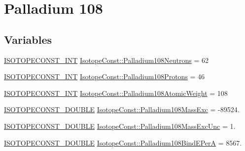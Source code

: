\hypertarget{group___isotope_const-_palladium-_pd108}{}\section{Palladium 108}
\label{group___isotope_const-_palladium-_pd108}
\subsection*{Variables}
\begin{DoxyCompactItemize}
\item 
\mbox{\hyperlink{group___isotope_const-_macros_ga5f18360b3e99483a35c32d789e62621c}{I\+S\+O\+T\+O\+P\+E\+C\+O\+N\+S\+T\+\_\+\+I\+NT}} \mbox{\hyperlink{group___isotope_const-_palladium-_pd108_ga0e9a31378d76be4f09b95a631b1e53ab}{Isotope\+Const\+::\+Palladium108\+Neutrons}} = 62
\item 
\mbox{\hyperlink{group___isotope_const-_macros_ga5f18360b3e99483a35c32d789e62621c}{I\+S\+O\+T\+O\+P\+E\+C\+O\+N\+S\+T\+\_\+\+I\+NT}} \mbox{\hyperlink{group___isotope_const-_palladium-_pd108_ga10b0eca9edb32d4bb560fc6b6796129f}{Isotope\+Const\+::\+Palladium108\+Protons}} = 46
\item 
\mbox{\hyperlink{group___isotope_const-_macros_ga5f18360b3e99483a35c32d789e62621c}{I\+S\+O\+T\+O\+P\+E\+C\+O\+N\+S\+T\+\_\+\+I\+NT}} \mbox{\hyperlink{group___isotope_const-_palladium-_pd108_ga8c3a585e456622df15ea3f302b5b0c2b}{Isotope\+Const\+::\+Palladium108\+Atomic\+Weight}} = 108
\item 
\mbox{\hyperlink{group___isotope_const-_macros_ga8f45a7272ce02c0b4c65c44636ed719a}{I\+S\+O\+T\+O\+P\+E\+C\+O\+N\+S\+T\+\_\+\+D\+O\+U\+B\+LE}} \mbox{\hyperlink{group___isotope_const-_palladium-_pd108_gaf3197bfd3aa5b496fa66a2fc3f87e04f}{Isotope\+Const\+::\+Palladium108\+Mass\+Exc}} = -\/89524.
\item 
\mbox{\hyperlink{group___isotope_const-_macros_ga8f45a7272ce02c0b4c65c44636ed719a}{I\+S\+O\+T\+O\+P\+E\+C\+O\+N\+S\+T\+\_\+\+D\+O\+U\+B\+LE}} \mbox{\hyperlink{group___isotope_const-_palladium-_pd108_ga9330b621dcc70ff15dc0342fa4af00ee}{Isotope\+Const\+::\+Palladium108\+Mass\+Exc\+Unc}} = 1.
\item 
\mbox{\hyperlink{group___isotope_const-_macros_ga8f45a7272ce02c0b4c65c44636ed719a}{I\+S\+O\+T\+O\+P\+E\+C\+O\+N\+S\+T\+\_\+\+D\+O\+U\+B\+LE}} \mbox{\hyperlink{group___isotope_const-_palladium-_pd108_ga4c73a48bd86e2b088756a4b0beb7cdf0}{Isotope\+Const\+::\+Palladium108\+Bind\+E\+PerA}} = 8567.
\item 

\end{DoxyCompactItemize}
